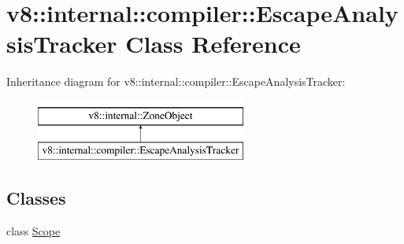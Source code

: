 \hypertarget{classv8_1_1internal_1_1compiler_1_1EscapeAnalysisTracker}{}\section{v8\+:\+:internal\+:\+:compiler\+:\+:Escape\+Analysis\+Tracker Class Reference}
\label{classv8_1_1internal_1_1compiler_1_1EscapeAnalysisTracker}
Inheritance diagram for v8\+:\+:internal\+:\+:compiler\+:\+:Escape\+Analysis\+Tracker\+:\begin{figure}[H]
\begin{center}
\leavevmode
\includegraphics[height=2.000000cm]{classv8_1_1internal_1_1compiler_1_1EscapeAnalysisTracker}
\end{center}
\end{figure}
\subsection*{Classes}
\begin{DoxyCompactItemize}
\item 
class \mbox{\hyperlink{classv8_1_1internal_1_1compiler_1_1EscapeAnalysisTracker_1_1Scope}{Scope}}
\end{DoxyCompactItemize}
